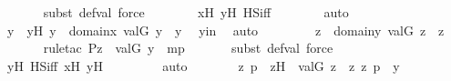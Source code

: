 \begin{isabellebody}
\ \ \ \ \ \ \isamarkupfalse%
{\isacharparenleft}{\kern0pt}subst\ def{\isacharunderscore}{\kern0pt}val{\isacharcomma}{\kern0pt}\ force{\isacharparenright}{\kern0pt}\isanewline
\ \ \ \ \ \ \isamarkupfalse%
\ x{\isacharprime}{\kern0pt}H\ yH\ HS{\isacharunderscore}{\kern0pt}iff\isanewline
\ \ \ \ \ \ \isamarkupfalse%
\ auto\isanewline
\ \ \ \ \isamarkupfalse%
\ \isamarkupfalse%
\ y{\isacharprime}{\kern0pt}\ \ y{\isacharprime}{\kern0pt}H{\isacharcolon}{\kern0pt}\ {\isachardoublequoteopen}y{\isacharprime}{\kern0pt}\ {\isasymin}\ domain{\isacharparenleft}{\kern0pt}x{\isacharprime}{\kern0pt}{\isacharparenright}{\kern0pt}{\isachardoublequoteclose}\ {\isachardoublequoteopen}val{\isacharparenleft}{\kern0pt}G{\isacharcomma}{\kern0pt}\ y{\isacharprime}{\kern0pt}{\isacharparenright}{\kern0pt}\ {\isacharequal}{\kern0pt}\ y{\isachardoublequoteclose}\ \isamarkupfalse%
\ yin\ \isamarkupfalse%
\ auto\ \isanewline
\ \ \ \ \isamarkupfalse%
\ \isamarkupfalse%
\ {\isachardoublequoteopen}{\isasymexists}z{\isacharprime}{\kern0pt}\ {\isasymin}\ domain{\isacharparenleft}{\kern0pt}y{\isacharprime}{\kern0pt}{\isacharparenright}{\kern0pt}{\isachardot}{\kern0pt}\ val{\isacharparenleft}{\kern0pt}G{\isacharcomma}{\kern0pt}\ z{\isacharprime}{\kern0pt}{\isacharparenright}{\kern0pt}\ {\isacharequal}{\kern0pt}\ z{\isachardoublequoteclose}\ \isanewline
\ \ \ \ \ \ \isamarkupfalse%
{\isacharparenleft}{\kern0pt}rule{\isacharunderscore}{\kern0pt}tac\ P{\isacharequal}{\kern0pt}{\isachardoublequoteopen}z\ {\isasymin}\ val{\isacharparenleft}{\kern0pt}G{\isacharcomma}{\kern0pt}\ y{\isacharprime}{\kern0pt}{\isacharparenright}{\kern0pt}{\isachardoublequoteclose}\ \ mp{\isacharparenright}{\kern0pt}\isanewline
\ \ \ \ \ \ \isamarkupfalse%
{\isacharparenleft}{\kern0pt}subst\ def{\isacharunderscore}{\kern0pt}val{\isacharcomma}{\kern0pt}\ force{\isacharparenright}{\kern0pt}\isanewline
\ \ \ \ \ \ \isamarkupfalse%
\ y{\isacharprime}{\kern0pt}H\ HS{\isacharunderscore}{\kern0pt}iff\ x{\isacharprime}{\kern0pt}H\ yH\ \isanewline
\ \ \ \ \ \ \isamarkupfalse%
\ auto\isanewline
\ \ \ \ \isamarkupfalse%
\ \isamarkupfalse%
\ z{\isacharprime}{\kern0pt}\ p\ \ z{\isacharprime}{\kern0pt}H\ {\isacharcolon}{\kern0pt}\ {\isachardoublequoteopen}val{\isacharparenleft}{\kern0pt}G{\isacharcomma}{\kern0pt}\ z{\isacharprime}{\kern0pt}{\isacharparenright}{\kern0pt}\ {\isacharequal}{\kern0pt}\ z{\isachardoublequoteclose}\ {\isachardoublequoteopen}{\isacharless}{\kern0pt}z{\isacharprime}{\kern0pt}{\isacharcomma}{\kern0pt}\ p{\isachargreater}{\kern0pt}\ {\isasymin}\ y{\isacharprime}{\kern0pt}{\isachardoublequoteclose}\ \isamarkupfalse%

\end{isabellebody}
